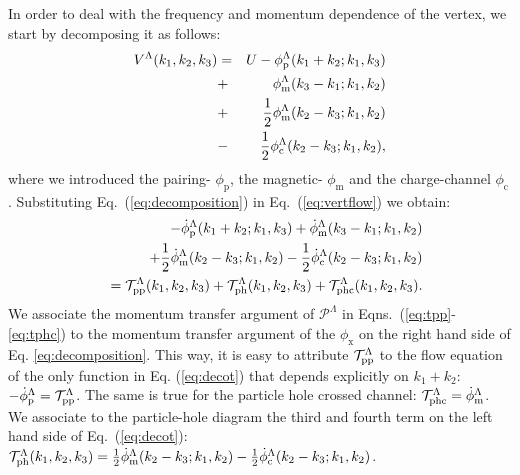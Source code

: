 
In order to deal with the frequency and momentum dependence of the vertex, we start by decomposing it as follows:\cite{Husemann2012} 
\begin{eqnarray}
\nonumber
V^{\Lambda}(k_1,k_2,k_3)&=& U - \phi^{\Lambda}_{\mathrm{p}}(k_1+k_2;k_1,k_3)  \\
&+& \phi^{\Lambda}_{\mathrm{m}}(k_3-k_1;k_1,k_2)  \nonumber
 \\ 
 &+&
  \frac{1}{2}  \phi^{\Lambda}_{\mathrm{m}}(k_2- k_3;k_1,k_2) \nonumber \\ & -& \frac{1}{2} \phi^{\Lambda}_{\mathrm{c}}(k_2-k_3;k_1,k_2),
 \label{eq:decomposition}
\end{eqnarray}
where we introduced the pairing- $\phi_{\mathrm{p}}$, the magnetic-  $\phi_{\mathrm{m}}$ and the charge-channel $\phi_{\mathrm{c}}$.
Substituting Eq.~(\ref{eq:decomposition}) in Eq.~(\ref{eq:vertflow}) we obtain: 
\begin{eqnarray}
\nonumber
&&-\dot \phi^{\Lambda}_{\mathrm{p}}(k_1+k_2;k_1,k_3)+ \dot \phi^{\Lambda}_{\mathrm{m}}(k_3-k_1;k_1,k_2)\\&& 
 + \frac{1}{2}  \dot\phi^{\Lambda}_{\mathrm{m}}(k_2- k_3;k_1,k_2)- \frac{1}{2} \dot\phi^{\Lambda}_{\mathrm{c}}(k_2-k_3;k_1,k_2)\\&&=
   \mathcal{T}^{\Lambda}_{\mathrm{pp} }(k_1,k_2,k_3) +  
  \mathcal{T}^{\Lambda}_{\mathrm{ph} }(k_1,k_2,k_3) + 
  \mathcal{T}^{\Lambda}_{\mathrm{phc} }(k_1,k_2,k_3).
  \nonumber
\label{eq:decot}
\end{eqnarray} 
We associate the momentum transfer argument of $\mathcal{P}^\Lambda$ in Eqns.~(\ref{eq:tpp}-\ref{eq:tphc}) to the momentum transfer argument of the $\phi_{\mathrm{x}}$ on the right hand side of Eq. \ref{eq:decomposition}.
This way, it is easy to attribute $\mathcal{T}^{\Lambda}_{\mathrm{pp} }$ to the flow equation of the only function in Eq. (\ref{eq:decot}) that depends explicitly on $k_1+k_2$: $-\dot\phi_{\mathrm{p}}^\Lambda=\mathcal{T}^{\Lambda}_{\mathrm{pp} }$. 
The same is true for the particle hole crossed channel: $\mathcal{T}^{\Lambda}_{\mathrm{phc} }=\dot\phi_{\mathrm{m}}^\Lambda$.  We associate to the particle-hole diagram the third and fourth term on the left hand side of Eq.~(\ref{eq:decot}): $\mathcal{T}^{\Lambda}_{\mathrm{ph} }(k_1,k_2,k_3)=\frac{1}{2}  \dot\phi^{\Lambda}_{\mathrm{m}}(k_2- k_3;k_1,k_2) - \frac{1}{2} \dot\phi^{\Lambda}_{\mathrm{c}}(k_2-k_3;k_1,k_2) $.  
